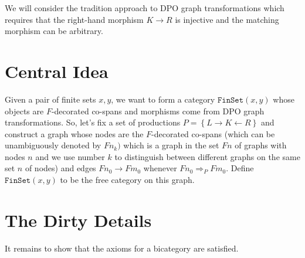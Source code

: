 \documentclass[10pt,a4paper]{article}
\newcommand{\cat}[1]{\mathtt{#1}}
\newcommand{\unto}{\leftarrow}
\renewcommand{\(}{\left(}
\renewcommand{\)}{\right)}
\renewcommand{\{}{\left\lbrace}
\renewcommand{\}}{\right\rbrace}
\theoremstyle{remark}
\theoremstyle{definition}
\begin{document}
We will consider the tradition approach to DPO graph transformations which requires that the right-hand morphism $K \to R$ is injective and the matching morphism can be arbitrary.  





\section*{Central Idea}

Given a pair of finite sets $x,y$, we want to form a category $\cat{FinSet}(x,y)$ whose objects are $F$-decorated co-spans and morphisms come from DPO graph transformations.  So, let's fix a set of productions $P = \{ L \to K \unto R \}$ and construct a graph  whose nodes are the $F$-decorated co-spans (which can be unambiguously denoted by $Fn_{k})$ which is a graph in the set $Fn$ of graphs with nodes $n$ and we use number $k$ to distinguish between different graphs on the same set $n$ of nodes) and edges $Fn_0 \to Fm_0$ whenever $Fn_0 \Rightarrow_P Fm_0$. Define $\cat{FinSet}(x,y)$ to be the free category on this graph.  


\section*{The Dirty Details}

It remains to show that the axioms for a bicategory are satisfied.        











	
\end{document}
